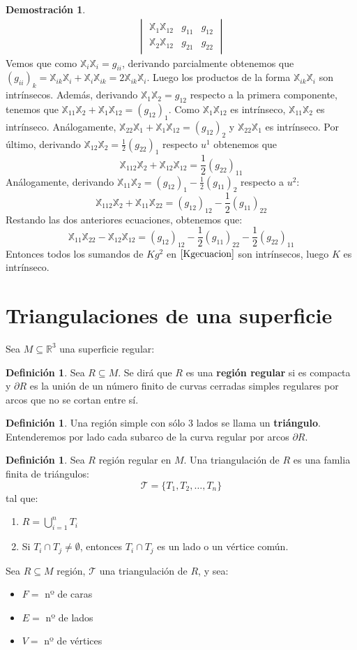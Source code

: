 \documentclass[twoside]{report}
\theoremstyle{definition}
\newtheorem{defi}[theorem]{Definición}
\newtheorem*{dem}{Demostración}
\numberwithin{equation}{section}
\newcommand{\R}{\mathbb{R}}
\newcommand{\X}{\mathbb{X}}
\begin{document}
\begin{dem}
\begin{align}
\begin{vmatrix}
	\X_1 \X_{12} & g_{11} & g_{12}\\
	\X_2 \X_{12} & g_{21} & g_{22}
\end{vmatrix}\label{Kgecuacion}
\end{align}
Vemos que como $\X_i \X_i = g_{ii}$, derivando parcialmente obtenemos que $(g_{ii})_k = \X_{ik}\X_i + \X_i\X_{ik} = 2\X_{ik}\X_i$. Luego los productos de la forma $\X_{ik}\X_i$ son intrínsecos. Además, derivando $\X_1\X_2 = g_{12}$ respecto a la primera componente, tenemos que $\X_{11}\X_2 + \X_1 \X_{12} = (g_{12})_1$. Como $\X_1\X_{12}$ es intrínseco, $\X_{11}\X_2$ es intrínseco. Análogamente, $\X_{22}\X_1 + \X_1 \X_{12} = (g_{12})_2$ y $\X_{22}\X_1$ es intrínseco. Por último, derivando $\X_{12}\X_2=\frac{1}{2}(g_{22})_1$ respecto $u^1$ obtenemos que 
\[\X_{112}\X_2 + \X_{12}\X_{12} = \frac{1}{2}(g_{22})_{11}\]
Análogamente, derivando $\X_{11} \X_2 = (g_{12})_1 - \frac{1}{2}(g_{11})_2$ respecto a $u^2$:
\[ \X_{112}\X_2 + \X_{11}\X_{22} = (g_{12})_{12} - \frac{1}{2}(g_{11})_{22}\]
Restando las dos anteriores ecuaciones, obtenemos que:
\[ \X_{11} \X_{22} - \X_{12}\X_{12} = (g_{12})_{12} - \frac{1}{2} (g_{11})_{22} - \frac{1}{2} (g_{22})_{11} \]
Entonces todos los sumandos de $Kg^2$ en $\eqref{Kgecuacion}$ son intrínsecos, luego $K$ es intrínseco.
\end{dem}

\section{Triangulaciones de una superficie}
Sea $M \subseteq \R^3$ una superficie regular:

\begin{defi}
Sea $R \subseteq M$. Se dirá que $R$ es una \textbf{región regular} si es compacta y $\partial R$ es la unión de un número finito de curvas cerradas simples regulares por arcos que no se cortan entre sí.
\end{defi}

\begin{defi}
Una región simple con sólo 3 lados se llama un \textbf{triángulo}. Entenderemos por lado cada subarco de la curva regular por arcos $\partial R$.
\end{defi}

\begin{defi}
Sea $R$ región regular en $M$. Una triangulación de $R$ es una famlia finita de triángulos:
\[ \mathcal{T} = \{ T_1, T_2, \dots, T_n \} \]
tal que:
\begin{enumerate}
	\item $R = \bigcup_{i=1}^n T_i$
	\item Si $T_i \cap T_j \neq \emptyset$, entonces $T_i \cap T_j$ es un lado o un vértice común.
\end{enumerate}
Sea $R \subseteq M$ región, $\mathcal{T}$ una triangulación de $R$, y sea:
\begin{itemize}
	\item $F =$ nº de caras
	\item $E =$ nº de lados
	\item $V =$ nº de vértices
\end{itemize}
\end{defi}
\end{document}
